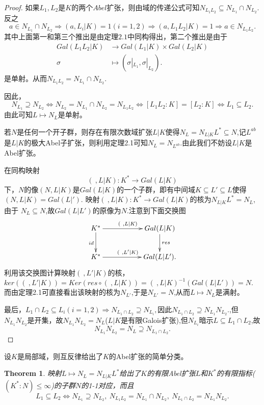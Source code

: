 \documentclass[UTF8]{article}
\newtheorem{thm}{Theorem}[section]
\begin{document}
\begin{proof}
	如果$L_{1},L_{2}$是$K$的两个$Abel$扩张，则由域的传递公式可知$N_{L_{1}L_{2}}\subseteq N_{L_{1}}\cap N_{L_{2}}$.反之
	$$
	a\in N_{L_{1}}\cap N_{L_{2}}\Rightarrow (a,L_{i}|K)=1(i=1,2)
	\Rightarrow (a,L_{1}L_{2}|K)=1\Rightarrow a\in N_{L_{1}L_{2}}.
	$$
	其中上面第一和第三个推出是由定理$2.1$中同构得出，第二个推出是由于
	\[
	\begin{split}
		Gal(L_{1}L_{2}|K)&\longrightarrow Gal(L_{1}|K)\times Gal(L_{2}|K) \\
		\sigma &\mapsto (\sigma|_{L_{1}},\sigma|_{L_{2}}).
	\end{split}
	\]
	是单射。从而$N_{L_{1}L_{2}}=N_{L_{1}}\cap N_{L_{2}}.$
	
	因此，$$N_{L_{1}}\supseteq N_{L_{2}}\Longleftrightarrow N_{L_{2}}=N_{L_{1}}\cap N_{L_{2}}=N_{L_{1}L_{2}}\Longleftrightarrow
	[L_{1}L_{2}:K]=[L_{2}:K]\Longleftrightarrow L_{1}\subseteq L_{2}.$$
	由此可知$L\mapsto N_{L}$是单射。
	
若$N$是任何一个开子群，则存在有限次数域扩张$L|K$使得$N_{L}=N_{L|K}L^{*}\subseteq N$,记$L^{ab}$是$L|K$的极大Abel子扩张，则利用定理2.1可知$N_{L}=N_{L^{ab}}.$由此我们不妨设$L|K$是Abel扩张。

  在同构映射$$
  (\ ,L|K):K^{*}\longrightarrow Gal(L|K)
  $$
下，$N$的像$(N,L|K)$是$Gal(L|K)$的一个子群，即有中间域$K\subseteq L'\subseteq L$使得$(N,L|K)=Gal(L|').$
映射$(\ ,L|K):K^{*}\longrightarrow Gal(L|K)$的核为$N_{L|K}L^{*}=N_{L}$,由于
$N_{L}\subseteq N$,故$Gal(L|L')$的原像为$N$.注意到下面交换图
$$
\xymatrix{
K^{*}\ar[rr]^{(\ ,L|K)}\ar[d]_{id}& &Gal(L|K)\ar[d]^{res}\\
K^{*}\ar[rr]^{(\ ,L'|K)}& &Gal(L|L'). 
}
$$
利用该交换图计算映射$(\ ,L'|K)$的核，$ker((\ ,L'|K))=Ker(res\circ (\ ,L|K))=
(\ ,L|K)^{-1}(Gal(L|L'))=N.$
而由定理2.1可直接看出该映射的核为$N_{L'}$,于是$N_{L'}=N$,从而$L\mapsto N_{L}$是满射。

最后，$L_{1}\cap L_{2}\subseteq L_{i}(i=1,2)\Rightarrow N_{L_{1}\cap L_{2}}\supseteq N_{L_{i}},$因此$N_{L_{1}\cap L_{2}}\supseteq N_{L_{1}}N_{L_{2}}.$,但$N_{L_{1}}N_{L_{2}}$是开集，故$N_{L_{1}}N_{L_{2}}=N_{L}$($L|K$是有限Galois扩张),但$N_{L_{i}}$暗示$L\subseteq L_{1}\cap L_{2}$,故
$$
N_{L_{1}}N_{L_{2}}=N_{L}\supseteq N_{L_{1}\cap L_{2}}.
$$	
\end{proof}
	设$K$是局部域，则互反律给出了$K$的Abel扩张的简单分类。
\begin{thm}
	映射$L\mapsto N_{L}=N_{L|K}L^{*}$给出了$K$的有限Abel扩张$L$和$K^{*}$的有限指标($(K^{*}:N)\leq \infty$)的子群$N$的1-1对应，而且
	$$
	L_{1}\subseteq L_{2}\Longleftrightarrow N_{L_{1}}\supseteq N_{L_{2}},\ 
	N_{L_{1}L_{2}}=N_{L_{1}}\cap N_{L_{2}},\  N_{L_{1}\cap L_{2}}=N_{L_{1}}N_{L_{2}}.
	$$
\end{thm}
\end{document}
